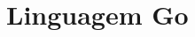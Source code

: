 \documentclass[12pt, %
openright, 
oneside, %
a4paper,    %
brazil]{facom-ufu-abntex2}
\begin{document}





\section{Linguagem Go}
\end{document}
